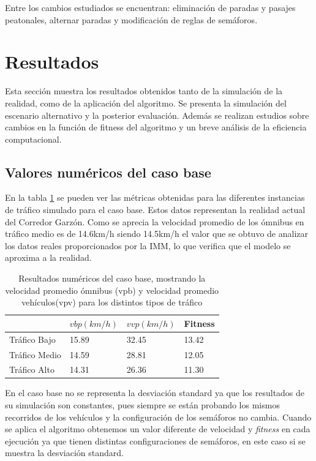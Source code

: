 Entre los cambios estudiados se encuentran: eliminación de paradas y pasajes peatonales, alternar paradas y modificación de reglas de semáforos.



\section{Resultados}
Esta sección muestra los resultados obtenidos tanto de la simulación de la realidad, como de la aplicación del algoritmo. Se presenta la simulación del escenario alternativo y la posterior evaluación. Además se realizan estudios sobre cambios en la función de fitness del algoritmo y un breve análisis de la eficiencia computacional.


\subsection{Valores numéricos del caso base}

En la tabla \ref{table:resultado_caso_base} se pueden ver las métricas obtenidas para las diferentes instancias de tráfico simulado para el caso base. Estos datos representan la realidad actual del Corredor Garzón. Como se aprecia la velocidad promedio de los ómnibus en tráfico medio es de 14.6km/h siendo 14.5km/h el valor que se obtuvo de analizar los datos reales proporcionados por la IMM, lo que verifica que el modelo se aproxima a la realidad. 
 
 \begin{table}[H]
 	\renewcommand{\arraystretch}{1.2}
 	\caption[Resultados numéricos del caso base.]{Resultados numéricos del caso base, mostrando la velocidad promedio ómnibus (vpb) y velocidad promedio vehículos(vpv) para los distintos tipos de tráfico}
 	\label{table:resultado_caso_base}
 	\centering
 	\begin{tabular}{p{2.5cm}p{2.5cm}p{2.5cm}p{2cm} }
 		\hline
 		&
 		$vbp(km/h)$& 
 		$vvp(km/h)$ & 
 		Fitness \\ 
 		\hline
 		Tráfico Bajo & 15.89  & 32.45& 13.42\\
 		Tráfico Medio & 14.59  & 28.81& 12.05\\
 		Tráfico Alto & 14.31  & 26.36& 11.30\\

 		\hline
 	\end{tabular}
 \end{table}
 
 En el caso base no se representa la desviación standard ya que los resultados de su simulación son constantes, pues siempre se están probando los mismos recorridos de los vehículos y la configuración de los semáforos no cambia. Cuando se aplica el algoritmo obtenemos un valor diferente de velocidad y \emph{fitness} en cada ejecución ya que tienen distintas configuraciones de semáforos, en este caso si se muestra la desviación standard.


